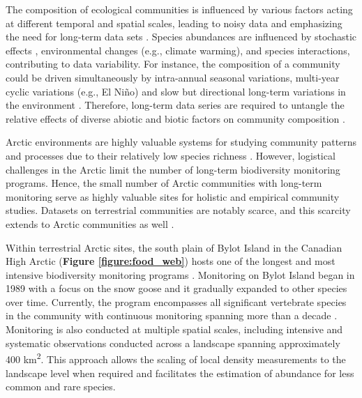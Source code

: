 \documentclass[a4paper,twoside,10pt]{article}
\begin{document}
The composition of ecological communities is influenced by various factors acting at different temporal and spatial scales, leading to noisy data and emphasizing the need for long-term data sets \citep{magurran2010, lindenmayer2012}. Species abundances are influenced by stochastic effects \citep{hubbell2001}, environmental changes (e.g., climate warming), and species interactions, contributing to data variability. For instance, the composition of a community could be driven simultaneously by intra-annual seasonal variations, multi-year cyclic variations (e.g., El Niño) and slow but directional long-term variations in the environment \citep{brown1990, snyder2006}. Therefore, long-term data series are required to untangle the relative effects of diverse abiotic and biotic factors on community composition \citep{magurran2010, lindenmayer2012}.

Arctic environments are highly valuable systems for studying community patterns and processes due to their relatively low species richness \citep{payer2013, legagneux2014}. However, logistical challenges in the Arctic limit the number of long-term biodiversity monitoring programs. Hence, the small number of Arctic communities with long-term monitoring serve as highly valuable sites for holistic and empirical community studies. Datasets on terrestrial communities are notably scarce, and this scarcity extends to Arctic communities as well \citep{ims2013}. 

Within terrestrial Arctic sites, the south plain of Bylot Island in the Canadian High Arctic (\textbf{Figure \ref{figure:food_web}}) hosts one of the longest and most intensive biodiversity monitoring programs \citep{gauthier2024a}. Monitoring on Bylot Island began in 1989 with a focus on the snow goose and it gradually expanded to other species over time. Currently, the program encompasses all significant vertebrate species in the community with continuous monitoring spanning more than a decade \citep{gauthier2024a}. Monitoring is also conducted at multiple spatial scales, including intensive and systematic observations conducted across a landscape spanning approximately 400 km\textsuperscript{2}. This approach allows the scaling of local density measurements to the landscape level when required and facilitates the estimation of abundance for less common and rare species. 
\end{document}
